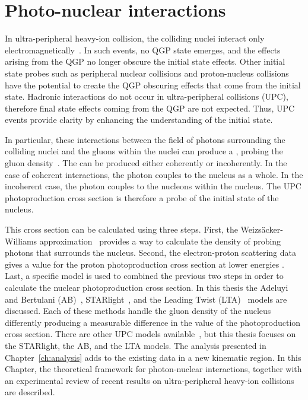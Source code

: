 \chapter{Photo-nuclear interactions \label{ch:photoNuc}}
    In ultra-peripheral heavy-ion collision, the colliding nuclei interact only 
      electromagnetically~\cite{Baltz:2007kq,Bertulani:2005ru}.   
    In such events, no QGP state emerges, and the effects arising from the QGP 
      no longer obscure the initial state effects.
    Other initial state probes such as peripheral nuclear collisions and 
      proton-nucleus collisions have the potential to create the QGP obscuring 
      effects that come from the initial state.
    Hadronic interactions do not occur in ultra-peripheral collisions (UPC), 
      therefore final state effects coming from the QGP are not expected. 
    Thus, UPC events provide clarity by enhancing the understanding of the 
      initial state. 
    
    In particular, these interactions between the field of photons surrounding 
      the colliding nuclei and the gluons within the nuclei can produce a 
      \JPsi{}, probing the gluon density~\cite{Ryskin:1992ui,Brodsky:1994kf}.
    The \JPsi{} can be produced either coherently or incoherently. 
    In the case of coherent interactions, the photon couples to the nucleus 
      as a whole.
    In the incoherent case, the photon couples to the nucleons within the 
      nucleus.
    The UPC \JPsi{} photoproduction cross section is therefore a probe of 
      the initial state of the nucleus.

    This cross section can be calculated using three steps.   
    First, the Weizs\"{a}cker-Williams approximation~\cite{vonWeizsacker:1934sx,Williams:1934ad} provides a way to calculate the 
      density of probing photons that surrounds the nucleus. 
    Second, the electron-proton scattering data gives a value for the proton 
      photoproduction cross section at lower energies \cite{Klasen:2007pm}.
    Last, a specific model is used to combined the previous two steps in order
      to calculate the nuclear photoproduction cross section. 
    In this thesis the Adeluyi and Bertulani (AB)~\cite{pQCD2011.08,pQCD2013.02}, STARlight~\cite{vmd1999,starlight}, and 
      the Leading Twist (LTA)~\cite{Frankfurt:2011cs,lta2011.09} models are discussed. 
    Each of these methods handle the gluon density of the nucleus differently 
      producing a measurable difference in the value of the \JPsi{} 
      photoproduction cross section. 
    There are other UPC models available~\cite{Goncalves:2011vf,Cisek:2012yt,Lappi:2013am,Hufner:1996jw}, 
      but this thesis focuses on the STARlight, the AB, and the LTA models.
    The analysis presented in Chapter~\ref{ch:analysis} adds to the existing 
      data in a new kinematic region.
    In this Chapter, the theoretical framework for photon-nuclear
      interactions, together with an experimental review of recent results on 
      ultra-peripheral heavy-ion collisions are described. 

